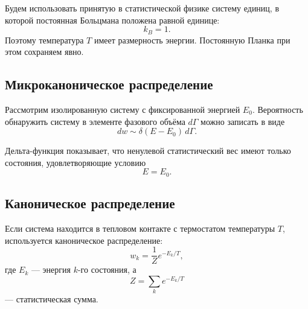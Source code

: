 \documentclass[../final.tex]{subfiles}
\begin{document}





Будем использовать принятую в статистической физике систему единиц,
в которой постоянная Больцмана положена равной единице:
%
\begin{equation*}
    k_B=1.
\end{equation*}
%
Поэтому температура $T$ имеет размерность энергии.
Постоянную Планка при этом сохраняем явно.



\subsection*{Микроканоническое распределение}

Рассмотрим изолированную систему с фиксированной энергией $E_0$.
Вероятность обнаружить систему в элементе фазового объёма $d\Gamma$
можно записать в виде
%
\begin{equation*}
    dw
    \sim
    \delta(E-E_0)\,d\Gamma.
\end{equation*}

Дельта-функция показывает, что ненулевой статистический вес
имеют только состояния, удовлетворяющие условию
%
\begin{equation*}
    E=E_0.
\end{equation*}



\subsection*{Каноническое распределение}

Если система находится в тепловом контакте с термостатом температуры
$T$, используется каноническое распределение:
%
\begin{equation*}
    w_k
    =
    \frac{1}{Z}
    e^{-E_k/T},
\end{equation*}
%
где $E_k$ --- энергия $k$-го состояния, а
%
\begin{equation*}
    Z
    =
    \sum_k
    e^{-E_k/T}
\end{equation*}
%
--- статистическая сумма.
\end{document}
